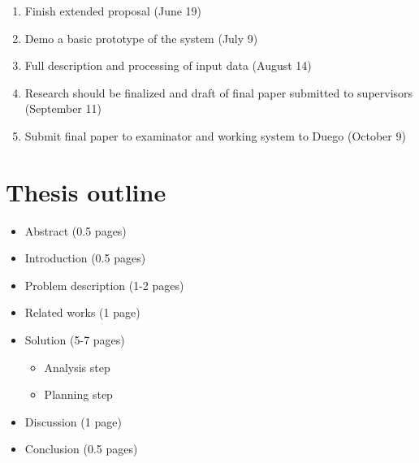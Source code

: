 \documentclass[a4paper]{article}
\begin{document}
\begin{enumerate}
	\item Finish extended proposal (June 19)
	\item Demo a basic prototype of the system (July 9)
	\item Full description and processing of input data (August 14)
	\item Research should be finalized and draft of final paper submitted to supervisors (September 11)
	\item Submit final paper to examinator and working system to Duego (October 9)
\end{enumerate}

\section{Thesis outline}
\begin{itemize}
	\item Abstract (0.5 pages)
 	\item Introduction (0.5 pages)
 	\item Problem description (1-2 pages)
 	\item Related works (1 page)
 	\item Solution (5-7 pages)
 	\begin{itemize}
		\item Analysis step
		\item Planning step
	\end{itemize}
	\item Discussion (1 page)
	\item Conclusion (0.5 pages)
\end{itemize}


\end{document}
